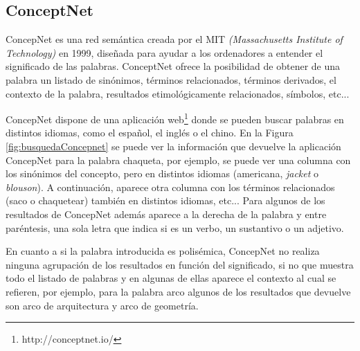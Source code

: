 \subsection{ConceptNet} 
\label{cap:subsec:concepnet}

ConcepNet es una red semántica creada por el MIT \textit{(Massachusetts Institute of Technology)} en 1999, diseñada para ayudar a los ordenadores a entender el significado de las palabras. ConceptNet ofrece la posibilidad de obtener de una palabra un listado de sinónimos, términos relacionados, términos derivados, el contexto de la palabra, resultados etimológicamente relacionados, símbolos, etc... 

ConcepNet dispone de una aplicación web\footnote{http://conceptnet.io/} donde se pueden buscar palabras en distintos idiomas,  como el español, el inglés o el chino.
En la Figura \ref{fig:busquedaConcepnet} se puede ver la información que devuelve la aplicación ConcepNet para la palabra chaqueta, por ejemplo, se puede ver una columna con los sinónimos del concepto, pero en distintos idiomas (americana, \textit{jacket} o \textit{blouson}).  A continuación, aparece otra columna con los términos relacionados (saco o chaquetear) también en distintos idiomas, etc... Para algunos de los resultados de ConcepNet además aparece a la derecha de la palabra y entre paréntesis, una sola letra que indica si es un verbo, un sustantivo o un adjetivo. 

En cuanto a si la palabra introducida es polisémica, ConcepNet no realiza ninguna agrupación de los resultados en función del significado, si no que muestra todo el listado de palabras y en algunas de ellas aparece el contexto al cual se refieren, por ejemplo, para la palabra arco algunos de los resultados que devuelve son arco de arquitectura y arco de geometría.

